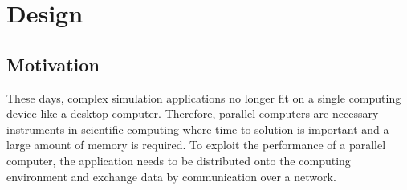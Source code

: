 \chapter{Design}
\label{sec:design}



\section{Motivation}
\label{sec:motivation}

These days, complex simulation applications no longer fit on a single
computing device like a desktop computer. Therefore, parallel
computers are necessary instruments in scientific computing where time
to solution is important and a large amount of memory is required.  To
exploit the performance of a parallel computer, the application needs
to be distributed onto the computing environment and exchange data by
communication over a network.

